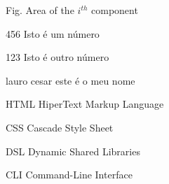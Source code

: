 \begin{siglas}
  \item[Fig.] Area of the $i^{th}$ component
  \item[456] Isto é um número
  \item[123] Isto é outro número
  \item[lauro cesar] este é o meu nome
  \item[HTML] HiperText Markup Language
  \item[CSS] Cascade Style Sheet
  \item[DSL] Dynamic Shared Libraries
  \item[CLI] Command-Line Interface
\end{siglas}
